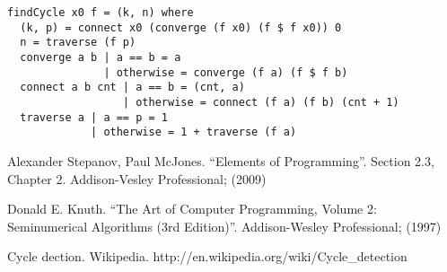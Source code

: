 \documentclass{article}
\begin{document}
\lstset{language=Haskell}
\begin{lstlisting}
findCycle x0 f = (k, n) where
  (k, p) = connect x0 (converge (f x0) (f $ f x0)) 0
  n = traverse (f p)
  converge a b | a == b = a
               | otherwise = converge (f a) (f $ f b)
  connect a b cnt | a == b = (cnt, a)
                  | otherwise = connect (f a) (f b) (cnt + 1)
  traverse a | a == p = 1
             | otherwise = 1 + traverse (f a)
\end{lstlisting}

\begin{thebibliography}{99}

Alexander Stepanov, Paul McJones. ``Elements of Programming''. Section 2.3, Chapter 2. Addison-Vesley Professional; (2009)

Donald E. Knuth. ``The Art of Computer Programming, Volume 2: Seminumerical Algorithms (3rd Edition)''. Addison-Wesley Professional; (1997)

Cycle dection. Wikipedia. http://en.wikipedia.org/wiki/Cycle\_detection

\end{thebibliography}
\end{document}
